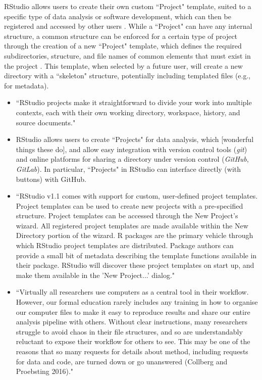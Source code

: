 \documentclass[pdftex,english,11pt,parskip=half]{scrartcl}
\begin{document}
RStudio allows users to create their own
custom ``Project" template, suited to a specific type of data analysis or
software development, which can then be registered and accessed by other users
\cite{rstudioprojecttemplate}. While a ``Project" can have any internal
structure, a common structure can be enforced for a certain type of project
through the creation of a new ``Project" template, which defines the required
subdirectories, structure, and file names of common elements that must exist in
the project \cite{rstudioprojecttemplate}. This template, when selected by a
future user, will create a new directory with a ``skeleton" structure,
potentially including templated files (e.g., for metadata).

\begin{itemize}
\item ``RStudio projects make it straightforward to divide your work into multiple contexts, each with their own working directory, workspace, history, and source documents." \cite{rstudiousingprojects} 
\item RStudio allows users to create ``Projects" for data analysis, which [wonderful things these do], and allow easy integration with version control tools (\textit{git}) and online platforms for sharing a directory under version control (\textit{GitHub}, \textit{GitLab}). In particular, ``Projects" in RStudio can interface directly (with buttons) with GitHub. 
\item ``RStudio v1.1 comes with support for custom, user-defined project templates. Project templates can be used to create new projects with a pre-specified structure. Project templates can be accessed through the New Project's wizard. All registered project templates are made available within the New Directory portion of the wizard. R packages are the primary vehicle through which RStudio project templates are distributed. Package authors can provide a small bit of metadata describing the template functions available in their package. RStudio will discover these project templates on start up, and make them available in the 'New Project...' dialog." \cite{rstudioprojecttemplate}
\item ``Virtually all researchers use computers as a central tool in their workflow. However, our formal education rarely includes any training in how to organise our computer files to make it easy to reproduce results and share our entire analysis pipeline with others. Without clear instructions, many researchers struggle to avoid chaos in their file structures, and so are understandably reluctant to expose their workflow for others to see. This may be one of the reasons that so many requests for details about method, including requests for data and code, are turned down or go unanswered (Collberg and Proebsting 2016)." \cite{marwick2018packaging}

\end{itemize}
\end{document}
